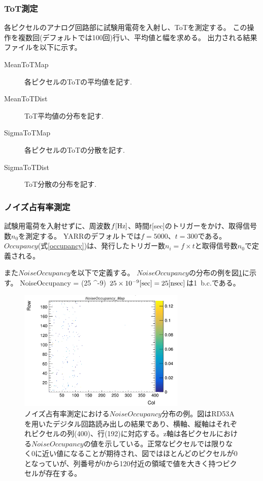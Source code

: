 \subsubsection{ToT測定}
各ピクセルのアナログ回路部に試験用電荷を入射し、ToTを測定する。
この操作を複数回(デフォルトでは100回)行い、平均値と幅を求める。
出力される結果ファイルを以下に示す。
\begin{description}
  \item [MeanToTMap] 各ピクセルのToTの平均値を記す.
  \item [MeanToTDist] ToT平均値の分布を記す. 
  \item [SigmaToTMap] 各ピクセルのToTの分散を記す.
  \item [SigmaToTDist] ToT分散の分布を記す.
\end{description}

\subsubsection{ノイズ占有率測定}
試験用電荷を入射せずに、周波数$f[{\rm Hz}]$、時間$t$[sec]のトリガーをかけ、取得信号数$n_0$を測定する。
YARRのデフォルトでは$f=5000、t=300$である。
$Occupancy$(式\ref{occupancy})は、発行したトリガー数$n_i=f \times t$と取得信号数$n_0$で定義される。

また$NoiseOccupancy$を以下で定義する。
$NoiseOccupancy$の分布の例を図\ref{noise_occ}に示す。
\bbb
NoiseOccupancy =  \times (25 ^{-9})
\eee
$25 \times 10^{-9}[{\rm sec}]=25[{\rm nsec}]$は1~b.c.である。

\begin{figure}[bpt]\centering
\includegraphics[width=8cm]{noise_occ}
\caption[ノイズ占有率測定における$NoiseOccupancy$分布の例。]{ノイズ占有率測定における$NoiseOccupancy$分布の例。図はRD53Aを用いたデジタル回路読み出しの結果であり、横軸、縦軸はそれぞれピクセルの列(400)、行(192)に対応する。z軸は各ピクセルにおける$NoiseOccupancy$の値を示している。正常なピクセルでは限りなく0に近い値になることが期待され、図ではほとんどのピクセルが0となっていが、列番号が0から120付近の領域で値を大きく持つピクセルが存在する。}
\label{noise_occ}
\end{figure}

